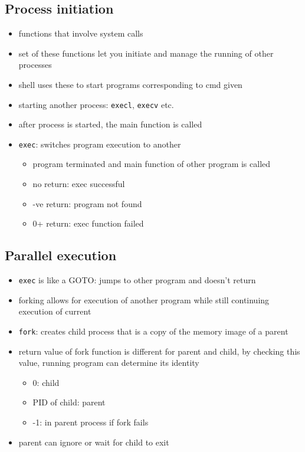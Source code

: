 \documentclass[10pt, multicolumn, a4paper]{article}
\begin{document}
\begin{multicols}{2}
	\subsection*{Process initiation}
	\begin{itemize}
	\item functions that involve system calls
	\item set of these functions let you initiate and manage the running of other processes
	\item shell uses these to start programs corresponding to cmd given
	\item starting another process: \verb|execl|, \verb|execv| etc.
	\item after process is started, the main function is called
	\item \verb|exec|: switches program execution to another
		\begin{itemize}
		\item program terminated and main function of other program is called
		\item no return: exec successful
		\item -ve return: program not found
		\item 0+ return: exec function failed
		\end{itemize}
	\end{itemize}
	\subsection*{Parallel execution}
	\begin{itemize}
	\item \verb|exec| is like a GOTO: jumps to other program and doesn't return
	\item forking allows for execution of another program while still continuing execution of current
	\item \verb|fork|: creates child process that is a copy of the memory image of a parent
	\item return value of fork function is different for parent and child, by checking this value, running program can determine its identity
		\begin{itemize}
		\item 0: child
		\item PID of child: parent
		\item -1: in parent process if fork fails
		\end{itemize}
	\item parent can ignore or wait for child to exit
	\end{itemize}

\end{multicols}
\end{document}

